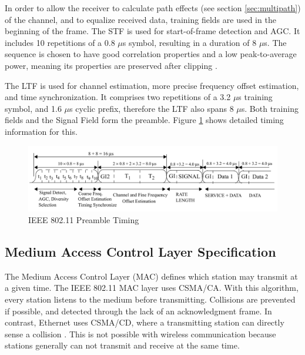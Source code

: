 In order to allow the receiver to calculate path effects (see section \ref{sec:multipath}) of the channel, and to equalize received data, training fields are used in the beginning of the frame. The \gls{STF} is used for start-of-frame detection and \gls{AGC}. It includes 10 repetitions of a 0.8 $\mu$s symbol, resulting in a duration of 8 $\mu$s. The sequence is chosen to have good correlation properties and a low peak-to-average power, meaning its properties are preserved after clipping \cite{perahia2013}.

The \gls{LTF} is used for channel estimation, more precise frequency offset estimation, and time synchronization. It comprises two repetitions of a 3.2 $\mu$s training symbol, and 1.6 $\mu$s cyclic prefix, therefore the \gls{LTF} also spans 8 $\mu$s. Both training fields and the Signal Field form the preamble. Figure \ref{fig:preamble} shows detailed timing information for this.

\begin{figure}[H]
	\centering
	\includegraphics[width=\textwidth]{gfx/images/preamble-format}
	\caption[IEEE 802.11 Preamble Timing]{IEEE 802.11 Preamble Timing \cite{ieee2012}}
	\label{fig:preamble}
\end{figure}


\subsection{Medium Access Control Layer Specification} \label{sec:mac-format}

The Medium Access Control Layer (MAC) defines which station may transmit at a given time. The \gls{IEEE} 802.11 \gls{MAC} layer uses \gls{CSMA/CA}. With this algorithm, every station listens to the medium before transmitting. Collisions are prevented if possible, and detected through the lack of an acknowledgment frame. In contrast, Ethernet uses \gls{CSMA/CD}, where a transmitting station can directly sense a collision \cite{ieee802-3}. This is not possible with wireless communication because stations generally can not transmit and receive at the same time.\\

